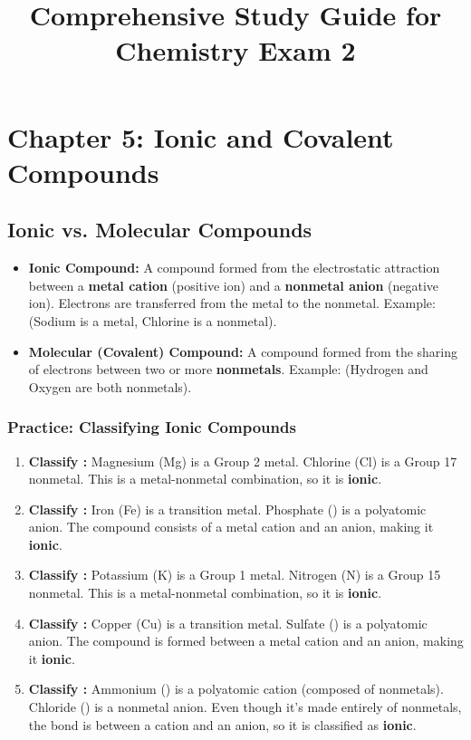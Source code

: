 \documentclass{article}
\title{\sffamily\bfseries Comprehensive Study Guide for Chemistry Exam 2}
\author{} %
\date{}
\begin{document}
\maketitle %
\thispagestyle{empty} %

\section*{Chapter 5: Ionic and Covalent Compounds}

\subsection*{Ionic vs. Molecular Compounds}
\begin{itemize}[itemsep=5pt]
    \item \textbf{Ionic Compound:} A compound formed from the electrostatic attraction between a \textbf{metal cation} (positive ion) and a \textbf{nonmetal anion} (negative ion). Electrons are transferred from the metal to the nonmetal. Example:  (Sodium is a metal, Chlorine is a nonmetal).
    \item \textbf{Molecular (Covalent) Compound:} A compound formed from the sharing of electrons between two or more \textbf{nonmetals}. Example:  (Hydrogen and Oxygen are both nonmetals).
\end{itemize}

\subsubsection*{Practice: Classifying Ionic Compounds}
\begin{enumerate}[itemsep=5pt]
    \item \textbf{Classify :} Magnesium (Mg) is a Group 2 metal. Chlorine (Cl) is a Group 17 nonmetal. This is a metal-nonmetal combination, so it is \textbf{ionic}.
    \item \textbf{Classify :} Iron (Fe) is a transition metal. Phosphate () is a polyatomic anion. The compound consists of a metal cation and an anion, making it \textbf{ionic}.
    \item \textbf{Classify :} Potassium (K) is a Group 1 metal. Nitrogen (N) is a Group 15 nonmetal. This is a metal-nonmetal combination, so it is \textbf{ionic}.
    \item \textbf{Classify :} Copper (Cu) is a transition metal. Sulfate () is a polyatomic anion. The compound is formed between a metal cation and an anion, making it \textbf{ionic}.
    \item \textbf{Classify :} Ammonium () is a polyatomic cation (composed of nonmetals). Chloride () is a nonmetal anion. Even though it's made entirely of nonmetals, the bond is between a cation and an anion, so it is classified as \textbf{ionic}.
\end{enumerate}
\end{document}
